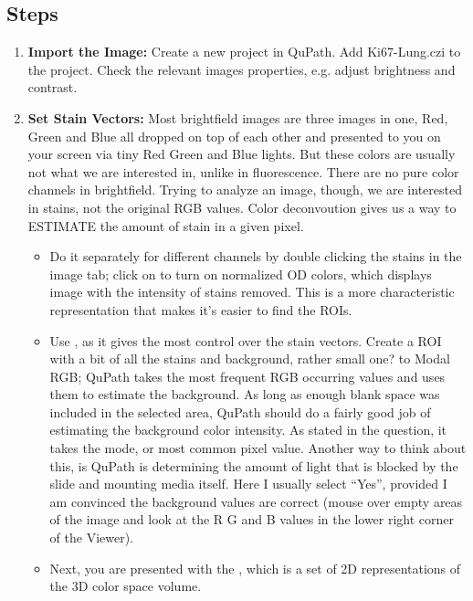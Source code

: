 \documentclass[a4paper,12pt]{article}
\begin{document}
\subsection{Steps}
\begin{enumerate}
    \item \textbf{Import the Image:} Create a new project in QuPath. Add Ki67-Lung.czi to the project. Check the relevant images properties, e.g. adjust brightness and contrast.
    \item \textbf{Set Stain Vectors:} Most brightfield images are three images in one, Red, Green and Blue all dropped on top of each other and presented to you on your screen via tiny Red Green and Blue lights. But these colors are usually not what we are interested in, unlike in fluorescence. There are no pure color channels in brightfield. Trying to analyze an image, though, we are interested in stains, not the original RGB values. Color deconvoution gives us a way to ESTIMATE the amount of stain in a given pixel.     \begin{itemize}
    \item Do it separately for different channels by double clicking the stains in the image tab; click on \soln {} \solnend to turn on normalized OD colors, which displays image with the intensity of stains removed. This is a more characteristic representation that makes it's easier to find the ROIs.
    \item Use \soln {} \solnend, as it gives the most control over the stain vectors. Create a ROI with a bit of all the stains and background, rather small one? \soln {} \solnend to Modal RGB; QuPath takes the most frequent RGB occurring values and uses them to estimate the background. As long as enough blank space was included in the selected area, QuPath should do a fairly good job of estimating the background color intensity. As stated in the question, it takes the mode, or most common pixel value. Another way to think about this, is QuPath is determining the amount of light that is blocked by the slide and mounting media itself. Here I usually select “Yes”, provided I am convinced the background values are correct (mouse over empty areas of the image and look at the R G and B values in the lower right corner of the Viewer).
    \item Next, you are presented with the \soln {}\solnend, which is a set of 2D representations of the 3D color space volume. 

\end{itemize}
\end{enumerate}
\end{document}
